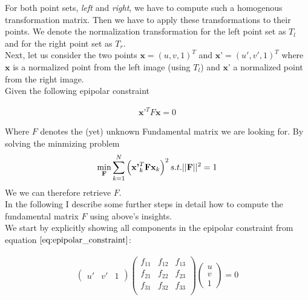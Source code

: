 \documentclass{paper}
\begin{document}
For both point sets, \emph{left} and \emph{right}, we have to compute such a homogenous transformation matrix. Then we have to apply these transformations to their points. We denote the normalization transformation for the left point set as $T_{l}$ and for the right point set as $T_{r}$. \\

Next, let us consider the two points $\textbf{x} = (u,v,1)^{T}$ and $\textbf{x'} = (u',v',1)^{T}$ where $\textbf{x}$ is a normalized point from the left image (using $T_l$) and $\textbf{x'}$ a normalized point from the right image. \\

Given the following epipolar constraint 

\begin{align}
    \textbf{x'}^{T} F \textbf{x} = 0
\label{eq:epipolar_constraint}
\end{align}

Where $F$ denotes the (yet) unknown Fundamental matrix we are looking for. By solving the minmizing problem 
\begin{align}
    \min_{\bf{F}} \sum^{N}_{k=1} \left(\textbf{x'}_{k}^{T} \textbf{F} \textbf{x}_{k}\right)^2 s.t. ||\textbf{F}||^2 = 1
\label{eq:min_problem}
\end{align}
 We we can therefore retrieve $F$. \\
 In the following I describe some further steps in detail how to compute the fundamental matrix $F$ using above's insights. \\

We start by explicitly showing all components in the epipolar constraint from equation $\ref{eq:epipolar_constraint}$: 

\begin{align}
\left(\begin{array}{ccc}
u' & v' & 1
\end{array}
\right)
\left(\begin{array}{ccc}
f_{11} & f_{12} & f_{13} \\
f_{21} & f_{22} & f_{23} \\
f_{31} & f_{32} & f_{33} \\
\end{array} \right)
\left(\begin{array}{c}
u \\
v \\
1
\end{array}
\right)
= 0
\label{eq:fundamental_matrix_block_form}
\end{align}
\end{document}
